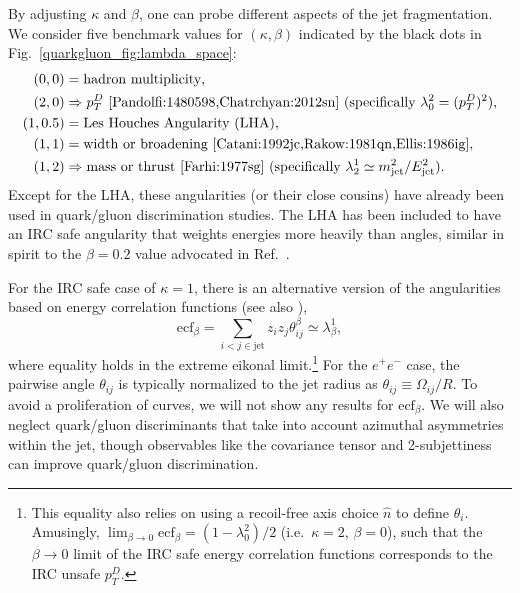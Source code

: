 \documentclass[11pt]{cernrep}
\begin{document}
By adjusting $\kappa$ and $\beta$, one can probe different aspects of the jet fragmentation.  We consider five benchmark values for $(\kappa, \beta)$ indicated by the black dots in Fig.~\ref{quarkgluon_fig:lambda_space}:
\begin{equation}
\label{quarkgluon_eq:benchmarkang}
\begin{aligned}
(0,0) &= \text{hadron multiplicity},\\
(2,0) &\Rightarrow p_T^D \text{  \cite{Pandolfi:1480598,Chatrchyan:2012sn} (specifically $\lambda^{2}_{0} = (p_T^D)^2$)},\\
(1,0.5) & = \text{Les Houches Angularity (LHA)},\\
(1,1) &= \text{width or broadening \cite{Catani:1992jc,Rakow:1981qn,Ellis:1986ig}},\\
(1,2) & \Rightarrow \text{mass or thrust \cite{Farhi:1977sg}
  (specifically $\lambda^{1}_{2} \simeq m_{\rm jet}^2 / E_{\rm
    jet}^2$)}.
\end{aligned}
\end{equation}
Except for the LHA, these angularities (or their close cousins) have already been used in quark/gluon discrimination studies.  The LHA has been included to have an IRC safe angularity that weights energies more heavily than angles, similar in spirit to the $\beta = 0.2$ value advocated in Ref.~\cite{Larkoski:2013eya}.

For the IRC safe case of $\kappa = 1$, there is an alternative version
of the angularities based on energy correlation functions \cite{Larkoski:2013eya} (see also \cite{Banfi:2004yd,Jankowiak:2011qa}),
\begin{equation}
\text{ecf}_\beta = \sum_{i < j \in \text{jet}} z_i z_j \theta_{ij}^\beta \simeq \lambda^{1}_{\beta},
\end{equation}
where equality holds in the extreme eikonal limit.\footnote{This equality also relies on using a recoil-free axis choice $\hat{n}$ to define $\theta_i$.  Amusingly, $\lim_{\beta \to 0} \text{ecf}_\beta = (1 - \lambda^{2}_{0})/2$ (i.e.~$\kappa = 2$, $\beta = 0$), such that the $\beta \to 0$ limit of the IRC safe energy correlation functions corresponds to the IRC unsafe $p_T^D$.}  For the $e^+ e^-$ case, the pairwise angle $\theta_{ij}$ is typically normalized to the jet radius as $\theta_{ij} \equiv \Omega_{ij}/R$.   To avoid a proliferation of curves, we will not show any results for $\text{ecf}_\beta$.  We will also neglect quark/gluon discriminants that take into account azimuthal asymmetries within the jet, though observables like the covariance tensor \cite{Gallicchio:2012ez} and 2-subjettiness \cite{Thaler:2010tr,Thaler:2011gf} can improve quark/gluon discrimination.
\end{document}
